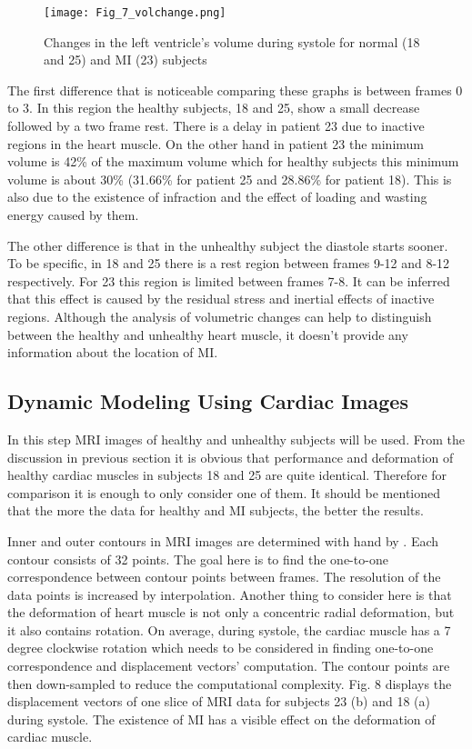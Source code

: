\documentclass{jicspack}
\begin{document}
\begin{figure}
\centering
\texttt{[image: Fig\_7\_volchange.png]}
\caption{Changes in the left ventricle's volume during systole for normal (18 and 25) and MI (23) subjects}
\end{figure}

The first difference that is noticeable comparing these graphs is between frames 0 to 3. In this
region the healthy subjects, 18 and 25, show a small decrease followed by a two frame rest.
There is a delay in patient 23 due to inactive regions in the heart muscle. 
On the other hand in patient 23 the minimum volume is 42\% of the maximum volume which
for healthy subjects this minimum volume is about 30\% (31.66\% for patient 25 and 28.86\%
for patient 18). This is also due to the existence of infraction and the effect of loading
and wasting energy caused by them.


The other difference is that in the unhealthy subject the diastole starts sooner. To be
specific, in 18 and 25 there is a rest region between frames 9-12 and 8-12 respectively. For
23 this region is limited between frames 7-8. It can be inferred that this effect is caused by
the residual stress and inertial effects of inactive regions.
Although the analysis of volumetric changes can help to distinguish between the healthy and
unhealthy heart muscle, it doesn't provide any information about the location of MI.


\subsection{Dynamic Modeling Using Cardiac Images }

In this step MRI images of healthy and unhealthy subjects will be used. From the discussion
in previous section it is obvious that performance and deformation of healthy cardiac
muscles in subjects 18 and 25 are quite identical. Therefore for comparison it is enough to
only consider one of them. It should be mentioned that the more the data for healthy and MI
subjects, the better the results.

Inner and outer contours in MRI images are determined with hand by \cite{23}. Each contour
consists of 32 points. The goal here is to find the one-to-one correspondence between
contour points between frames. The resolution of the data points is increased by interpolation. Another thing to consider here is that the deformation of
heart muscle is not only a concentric radial deformation, but it also contains rotation. On
average, during systole, the cardiac muscle has a 7 degree clockwise rotation which needs to be considered in finding one-to-one correspondence and displacement vectors' computation. The contour points are then down-sampled to reduce the computational complexity. Fig. 8 displays the displacement vectors of one slice of MRI data for subjects 23 (b) and 18 (a) during systole. The existence of MI has a visible effect on the deformation of cardiac muscle. 
\end{document}
